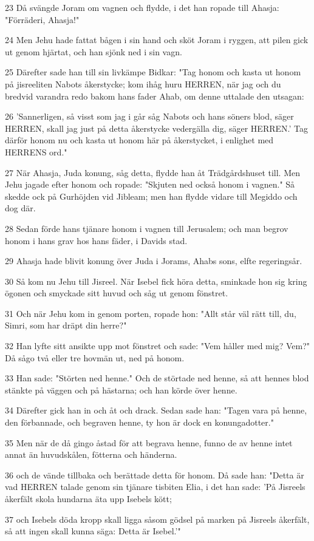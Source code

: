 \par 23 Då svängde Joram om vagnen och flydde, i det han ropade till Ahasja: "Förräderi, Ahasja!"
\par 24 Men Jehu hade fattat bågen i sin hand och sköt Joram i ryggen, att pilen gick ut genom hjärtat, och han sjönk ned i sin vagn.
\par 25 Därefter sade han till sin livkämpe Bidkar: "Tag honom och kasta ut honom på jisreeliten Nabots åkerstycke; kom ihåg huru HERREN, när jag och du bredvid varandra redo bakom hans fader Ahab, om denne uttalade den utsagan:
\par 26 'Sannerligen, så visst som jag i går såg Nabots och hans söners blod, säger HERREN, skall jag just på detta åkerstycke vedergälla dig, säger HERREN.' Tag därför honom nu och kasta ut honom här på åkerstycket, i enlighet med HERRENS ord."
\par 27 När Ahasja, Juda konung, såg detta, flydde han åt Trädgårdshuset till. Men Jehu jagade efter honom och ropade: "Skjuten ned också honom i vagnen." Så skedde ock på Gurhöjden vid Jibleam; men han flydde vidare till Megiddo och dog där.
\par 28 Sedan förde hans tjänare honom i vagnen till Jerusalem; och man begrov honom i hans grav hos hans fäder, i Davids stad.
\par 29 Ahasja hade blivit konung över Juda i Jorams, Ahabs sons, elfte regeringsår.
\par 30 Så kom nu Jehu till Jisreel. När Isebel fick höra detta, sminkade hon sig kring ögonen och smyckade sitt huvud och såg ut genom fönstret.
\par 31 Och när Jehu kom in genom porten, ropade hon: "Allt står väl rätt till, du, Simri, som har dräpt din herre?"
\par 32 Han lyfte sitt ansikte upp mot fönstret och sade: "Vem håller med mig? Vem?" Då sågo två eller tre hovmän ut, ned på honom.
\par 33 Han sade: "Störten ned henne." Och de störtade ned henne, så att hennes blod stänkte på väggen och på hästarna; och han körde över henne.
\par 34 Därefter gick han in och åt och drack. Sedan sade han: "Tagen vara på henne, den förbannade, och begraven henne, ty hon är dock en konungadotter."
\par 35 Men när de då gingo åstad för att begrava henne, funno de av henne intet annat än huvudskålen, fötterna och händerna.
\par 36 och de vände tillbaka och berättade detta för honom. Då sade han: "Detta är vad HERREN talade genom sin tjänare tisbiten Elia, i det han sade: 'På Jisreels åkerfält skola hundarna äta upp Isebels kött;
\par 37 och Isebels döda kropp skall ligga såsom gödsel på marken på Jisreels åkerfält, så att ingen skall kunna säga: Detta är Isebel.'"

